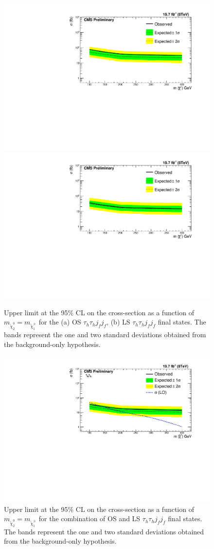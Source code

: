 \begin{figure}
  \begin{center}
    \includegraphics[angle=0,width=.48\textwidth, height=0.35\textheight]{PLOTS/Limit_VBF_diTau_OS.pdf}
    \includegraphics[angle=0,width=.48\textwidth, height=0.35\textheight]{PLOTS/Limit_VBF_diTau_LS.pdf}
    \caption{Upper limit at the 95\% CL on the cross-section as a function of 
$m_{\tilde{\chi}_{2}^{0}}=m_{\tilde{\chi}_{1}^{\pm}}$ for the (a) OS 
$\tau_{h}\tau_{h} j_{f} j_{f}$, (b) LS $\tau_{h}\tau_{h} j_{f} j_{f}$
final states. The bands represent the one and two standard deviations obtained from the background-only hypothesis.}
  \label{fig:LimitsOSLS}
 \end{center}
\end{figure}

\begin{figure}
  \begin{center}
    \includegraphics[angle=0,scale=0.8]{PLOTS/Limit_VBF_diTau_combined.pdf}
    \caption{Upper limit at the 95\% CL on the cross-section as a function of 
$m_{\tilde{\chi}_{2}^{0}}=m_{\tilde{\chi}_{1}^{\pm}}$ for the combination of OS and LS $\tau_{h}\tau_{h} j_{f} j_{f}$
final states. The bands represent the one and two standard deviations obtained from the background-only hypothesis.}
    \label{fig:LimitsCombination}
 \end{center}
\end{figure}

